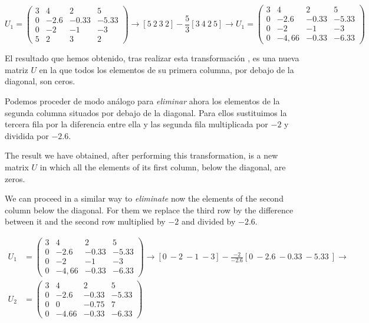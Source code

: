 \begin{equation*}
U_1=\begin{pmatrix}
3& 4& 2&5\\
0& -2.6& -0.33& -5.33\\
0& -2& -1& -3\\
5& 2& 3& 2
\end{pmatrix} \rightarrow [5\ 2\ 3\ 2]-\frac{5}{3} [3\ 4\ 2\ 5] \rightarrow U_1=\begin{pmatrix}
3& 4& 2&5\\
0& -2.6& -0.33& -5.33\\
0& -2& -1& -3\\
0& -4,66& -0.33& -6.33
\end{pmatrix}
\end{equation*}

\begin{paracol}{2}

El resultado que hemos obtenido, tras realizar esta transformación , es una nueva matriz $U$ en la que todos los elementos de su primera columna, por debajo de la diagonal, son ceros.

Podemos proceder de modo análogo para \emph{eliminar} ahora los elementos de la segunda columna situados por debajo de la diagonal. Para ellos sustituimos la tercera fila  por la diferencia entre ella y las segunda fila multiplicada por 	$-2$  y dividida por $-2.6$.

\switchcolumn

The result we have obtained, after performing this transformation, is a new matrix $U$ in which all the elements of its first column, below the diagonal, are zeros.

We can proceed in a similar way to \emph{eliminate} now the elements of the second column below the diagonal. For them we replace the third row by the difference between it and the second row multiplied by $-2$ and divided by $-2.6$.
\end{paracol}

\begin{align*}
U_1 &=\begin{pmatrix}
3& 4& 2&5\\
0& -2.6& -0.33& -5.33\\
0& -2& -1& -3\\
0& -4,66& -0.33& -6.33
\end{pmatrix} \rightarrow [0\ -2\ -1\ -3]-\frac{-2}{-2.6} [0\ -2.6\ -0.33\ -5.33\ ] \rightarrow \\
 U_2 &=\begin{pmatrix}
3& 4& 2&5\\
0& -2.6& -0.33& -5.33\\
0& 0& -0.75& 7\\
0& -4.66& -0.33& -6.33
\end{pmatrix}
\end{align*}

